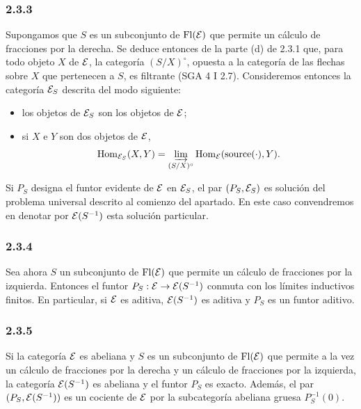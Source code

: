 \subsubsection*{2.3.3}
Supongamos que $S$ es un subconjunto de $\operatorname{Fl}(\mathcal E)$ que permite un cálculo de fracciones por la derecha. Se deduce entonces de la parte (d) de 2.3.1 que, para todo objeto $X$ de $\mathcal E$, la categoría $(S/X)^\circ$, opuesta a la categoría de las flechas sobre $X$ que pertenecen a $S$, es filtrante (SGA 4 I 2.7). Consideremos entonces la categoría $\mathcal E_S$ descrita del modo siguiente:
\begin{itemize}
\item los objetos de $\mathcal E_S$ son los objetos de $\mathcal E$;
\item si $X$ e $Y$ son dos objetos de $\mathcal E$,
\[
\operatorname{Hom}_{\mathcal E_S}(X,Y)=\varinjlim_{(S/X)^\circ}\operatorname{Hom}_{\mathcal E}(\operatorname{source}(\cdot),Y).
\]
\end{itemize}
Si $P_S$ designa el funtor evidente de $\mathcal E$ en $\mathcal E_S$, el par $(P_S,\mathcal E_S)$ es solución del problema universal descrito al comienzo del apartado. En este caso convendremos en denotar por $\mathcal E(S^{-1})$ esta solución particular.

\subsubsection*{2.3.4}
Sea ahora $S$ un subconjunto de $\operatorname{Fl}(\mathcal E)$ que permite un cálculo de fracciones por la izquierda. Entonces el funtor $P_S:\mathcal E\to\mathcal E(S^{-1})$ conmuta con los límites inductivos finitos. En particular, si $\mathcal E$ es aditiva, $\mathcal E(S^{-1})$ es aditiva y $P_S$ es un funtor aditivo.

\subsubsection*{2.3.5}
Si la categoría $\mathcal E$ es abeliana y $S$ es un subconjunto de $\operatorname{Fl}(\mathcal E)$ que permite a la vez un cálculo de fracciones por la derecha y un cálculo de fracciones por la izquierda, la categoría $\mathcal E(S^{-1})$ es abeliana y el funtor $P_S$ es exacto. Además, el par $(P_S,\mathcal E(S^{-1}))$ es un cociente de $\mathcal E$ por la subcategoría abeliana gruesa $P_S^{-1}(0)$.
